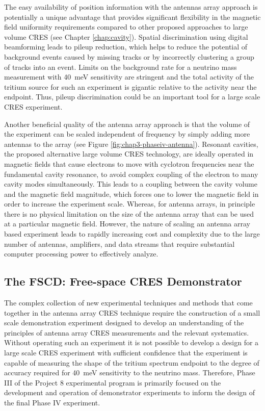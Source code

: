 The easy availability of position information with the antennas array approach is potentially a unique advantage that provides significant flexibility in the magnetic field uniformity requirements compared to other proposed approaches to large volume CRES (see Chapter \ref{chap:cavity}). Spatial discrimination using digital beamforming leads to pileup reduction, which helps to reduce the potential of background events caused by missing tracks or by incorrectly clustering a group of tracks into an event. Limits on the background rate for a neutrino mass measurement with 40~meV sensitivity are stringent and the total activity of the tritium source for such an experiment is gigantic relative to the activity near the endpoint. Thus, pileup discrimination could be an important tool for a large scale CRES experiment.

Another beneficial quality of the antenna array approach is that the volume of the experiment can be scaled independent of frequency by simply adding more antennas to the array (see Figure \ref{fig:chap3-phaseiv-antenna}). Resonant cavities, the proposed alternative large volume CRES technology, are ideally operated in magnetic fields that cause electrons to move with cyclotron frequencies near the fundamental cavity resonance, to avoid complex coupling of the electron to many cavity modes simultaneously. This leads to a coupling between the cavity volume and the magnetic field magnitude, which forces one to lower the magnetic field in order to increase the experiment scale. Whereas, for antenna arrays, in principle there is no physical limitation on the size of the antenna array that can be used at a particular magnetic field. However, the nature of scaling an antenna array based experiment leads to rapidly increasing cost and complexity due to the large number of antennas, amplifiers, and data streams that require substantial computer processing power to effectively analyze.

\subsection{The FSCD: Free-space CRES Demonstrator}

The complex collection of new experimental techniques and methods that come together in the antenna array CRES technique require the construction of a small scale demonstration experiment designed to develop an understanding of the principles of antenna array CRES measurements and the relevant systematics. Without operating such an experiment it is not possible to develop a design for a large scale CRES experiment with sufficient confidence that the experiment is capable of measuring the shape of the tritium spectrum endpoint to the degree of accuracy required for 40~meV sensitivity to the neutrino mass. Therefore, Phase III of the Project 8 experimental program is primarily focused on the development and operation of demonstrator experiments to inform the design of the final Phase IV experiment.

